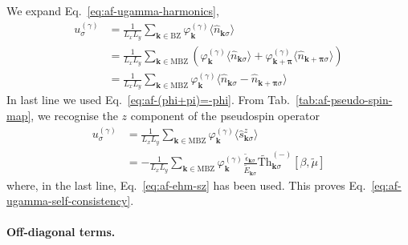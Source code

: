 \begin{tabproof}

	We expand Eq.~\eqref{eq:af-ugamma-harmonics},
	\[
	\begin{aligned}
		u^{(\gamma)}_\sigma &= \frac{1}{L_x L_y} \sum_{\mathbf{k}\in\mathrm{BZ}} \varphi_\mathbf{k}^{(\gamma)}
		\langle
		\hat n_{\mathbf{k}\sigma}
		\rangle \\
		&= \frac{1}{L_x L_y} \sum_{\mathbf{k}\in\mathrm{MBZ}} \left(
		\varphi_\mathbf{k}^{(\gamma)}
		\langle
		\hat n_{\mathbf{k}\sigma}
		\rangle
		+
		\varphi_{\mathbf{k}+\bm{\pi}}^{(\gamma)}
		\langle
		\hat n_{\mathbf{k}+\bm{\pi}\sigma}
		\rangle
		\right) \\
		&= \frac{1}{L_x L_y} \sum_{\mathbf{k}\in\mathrm{MBZ}} \varphi_\mathbf{k}^{(\gamma)}
		\langle
		\hat n_{\mathbf{k}\sigma}
		-
		\hat n_{\mathbf{k}+\bm{\pi}\sigma}
		\rangle
	\end{aligned}
	\]
	In last line we used Eq.~\eqref{eq:af-(phi+pi)=-phi}. From Tab.~\ref{tab:af-pseudo-spin-map}, we recognise the $z$ component of the pseudospin operator
	\begin{align}
		u^{(\gamma)}_\sigma &= \frac{1}{L_x L_y} \sum_{\mathbf{k}\in\mathrm{MBZ}} \varphi_\mathbf{k}^{(\gamma)}
		\langle
		\hat s_{\mathbf{k}\sigma}^z
		\rangle \nonumber\\
		&= -\frac{1}{L_x L_y} \sum_{\mathbf{k}\in\mathrm{MBZ}} \varphi_\mathbf{k}^{(\gamma)}
		\frac{\tilde{\epsilon}_{\mathbf{k}\sigma}}{\tilde{E}_{\mathbf{k}\sigma}} \tilde{\mathrm{Th}}_{\mathbf{k}\sigma}^{(-)}[\beta,\tilde{\mu}] \label{eq:af-ugamma-chain}
	\end{align}
	where, in the last line, Eq.~\eqref{eq:af-ehm-sz} has been used. This proves Eq.~\eqref{eq:af-ugamma-self-consistency}.
	
\end{tabproof}

\paragraph{Off-diagonal terms.}

